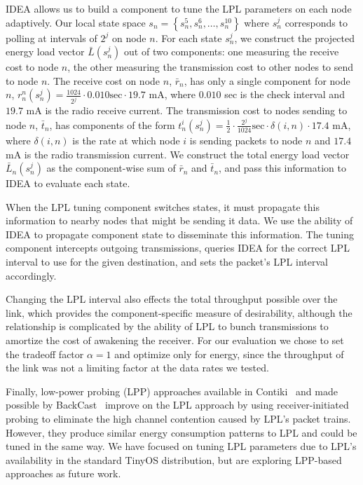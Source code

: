 \documentclass{sig-alternate}
\begin{document}
IDEA allows us to build a component to tune the LPL parameters on each node
adaptively. Our local state space $s_n = \left\{s_n^5, s_n^6, \ldots,
s_n^{10} \right\}$ where $s_n^j$ corresponds to polling at intervals of $2^j$
on node $n$. For each state $s^j_n$, we construct the projected energy load
vector $\bar{L}(s^j_n)$ out of two components: one measuring the receive cost
to node $n$, the other measuring the transmission cost to other nodes to send
to node $n$. The receive cost on node $n$, $\bar{r}_n$, has only a single
component for node $n$, $r_n^n(s_n^j) = \frac{1024}{2^j} \cdot 0.010
\textrm{sec} \cdot 19.7$ mA, where $0.010$ sec is the check interval and
$19.7$ mA is the radio receive current. The transmission cost to nodes
sending to node $n$, $\bar{t}_n$, has components of the form $t^i_n(s_n^j) =
\frac{1}{2} \cdot \frac{2^j}{1024} \textrm{sec} \cdot \delta(i,n) \cdot 17.4$
mA, where $\delta(i,n)$ is the rate at which node $i$ is sending packets to
node $n$ and $17.4$ mA is the radio transmission current. We construct the
total energy load vector $\bar{L}_n(s^j_n)$ as the component-wise sum of
$\bar{r}_n$ and $\bar{t}_n$, and pass this information to IDEA to evaluate
each state.

When the LPL tuning component switches states, it must propagate this
information to nearby nodes that might be sending it data. We use the ability
of IDEA to propagate component state to disseminate this information. The
tuning component intercepts outgoing transmissions, queries IDEA for the
correct LPL interval to use for the given destination, and sets the packet's
LPL interval accordingly.

Changing the LPL interval also effects the total throughput possible over the
link, which provides the component-specific measure of desirability, although
the relationship is complicated by the ability of LPL to bunch transmissions
to amortize the cost of awakening the receiver. For our evaluation we chose
to set the tradeoff factor $\alpha=1$ and optimize only for energy, since the
throughput of the link was not a limiting factor at the data rates we tested.

Finally, low-power probing (LPP) approaches available in
Contiki~\cite{contiki} and made possible by BackCast~\cite{backcast-hotnets}
improve on the LPL approach by using receiver-initiated probing to eliminate
the high channel contention caused by LPL's packet trains. However, they
produce similar energy consumption patterns to LPL and could be tuned in the
same way. We have focused on tuning LPL parameters due to LPL's availability
in the standard TinyOS distribution, but are exploring LPP-based approaches
as future work.
\end{document}
